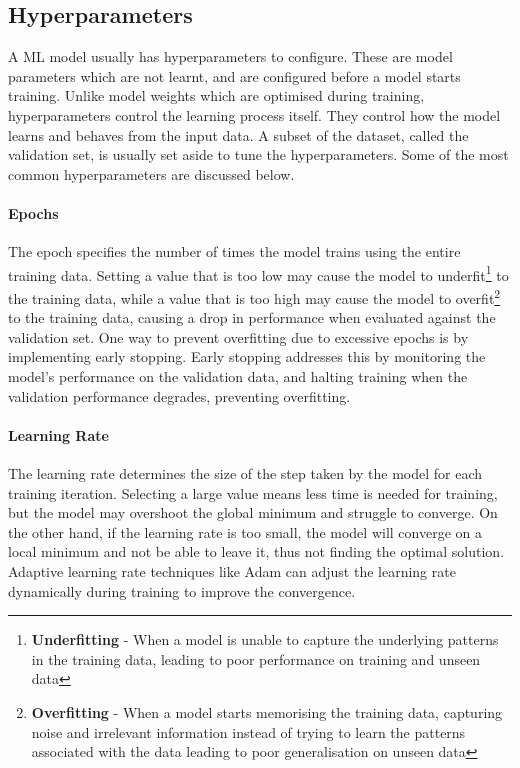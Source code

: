 \subsection{Hyperparameters}
A ML model usually has hyperparameters to configure. These are model parameters which are not learnt, and are configured before a model starts training. Unlike model weights which are optimised during training, hyperparameters control the learning process itself. They control how the model learns and behaves from the input data. A subset of the dataset, called the validation set, is usually set aside to tune the hyperparameters. Some of the most common hyperparameters are discussed below.

\paragraph{Epochs} \label{ML:Epochs} The epoch specifies the number of times the model trains using the entire training data. Setting a value that is too low may cause the model to underfit\footnote{\textbf{Underfitting} - When a model is unable to capture the underlying patterns in the training data, leading to poor performance on training and unseen data} to the training data, while a value that is too high may cause the model to overfit\footnote{\textbf{Overfitting} - When a model starts memorising the training data, capturing noise and irrelevant information instead of trying to learn the patterns associated with the data leading to poor generalisation on unseen data} to the training data, causing a drop in performance when evaluated against the validation set. One way to prevent overfitting due to excessive epochs is by implementing early stopping. Early stopping addresses this by monitoring the model's performance on the validation data, and halting training when the validation performance degrades, preventing overfitting.

\paragraph{Learning Rate} \label{ML:LearningRate} The learning rate determines the size of the step taken by the model for each training iteration. Selecting a large value means less time is needed for training, but the model may overshoot the global minimum and struggle to converge. On the other hand, if the learning rate is too small, the model will converge on a local minimum and not be able to leave it, thus not finding the optimal solution. Adaptive learning rate techniques like Adam can adjust the learning rate dynamically during training to improve the convergence.

